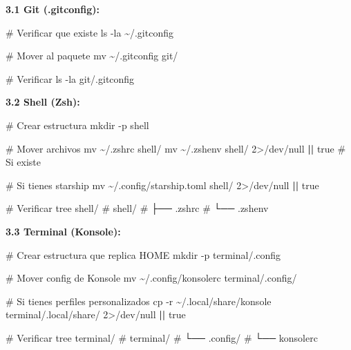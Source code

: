 \documentclass[
  doc,
  floatsintext,
  longtable,
  a4paper,
  nolmodern,
  notxfonts,
  notimes,
  12pt,
  colorlinks=true,linkcolor=blue,citecolor=blue,urlcolor=blue]{apa7}
\newenvironment{Shaded}{\begin{snugshade}}{\end{snugshade}}
\newcommand{\AttributeTok}[1]{\textcolor[rgb]{0.40,0.45,0.13}{#1}}
\newcommand{\CommentTok}[1]{\textcolor[rgb]{0.37,0.37,0.37}{#1}}
\newcommand{\DecValTok}[1]{\textcolor[rgb]{0.68,0.00,0.00}{#1}}
\newcommand{\ExtensionTok}[1]{\textcolor[rgb]{0.00,0.23,0.31}{#1}}
\newcommand{\FunctionTok}[1]{\textcolor[rgb]{0.28,0.35,0.67}{#1}}
\newcommand{\KeywordTok}[1]{\textcolor[rgb]{0.00,0.23,0.31}{\textbf{#1}}}
\newcommand{\NormalTok}[1]{\textcolor[rgb]{0.00,0.23,0.31}{#1}}
\newcommand{\OperatorTok}[1]{\textcolor[rgb]{0.37,0.37,0.37}{#1}}
\begin{document}
\textbf{3.1 Git (.gitconfig):}

\begin{Shaded}
\begin{Highlighting}[]
\CommentTok{\# Verificar que existe}
\FunctionTok{ls} \AttributeTok{{-}la}\NormalTok{ \textasciitilde{}/.gitconfig}

\CommentTok{\# Mover al paquete}
\FunctionTok{mv}\NormalTok{ \textasciitilde{}/.gitconfig git/}

\CommentTok{\# Verificar}
\FunctionTok{ls} \AttributeTok{{-}la}\NormalTok{ git/.gitconfig}
\end{Highlighting}
\end{Shaded}

\textbf{3.2 Shell (Zsh):}

\begin{Shaded}
\begin{Highlighting}[]
\CommentTok{\# Crear estructura}
\FunctionTok{mkdir} \AttributeTok{{-}p}\NormalTok{ shell}

\CommentTok{\# Mover archivos}
\FunctionTok{mv}\NormalTok{ \textasciitilde{}/.zshrc shell/}
\FunctionTok{mv}\NormalTok{ \textasciitilde{}/.zshenv shell/ }\DecValTok{2}\OperatorTok{\textgreater{}}\NormalTok{/dev/null }\KeywordTok{||} \FunctionTok{true}  \CommentTok{\# Si existe}

\CommentTok{\# Si tienes starship}
\FunctionTok{mv}\NormalTok{ \textasciitilde{}/.config/starship.toml shell/ }\DecValTok{2}\OperatorTok{\textgreater{}}\NormalTok{/dev/null }\KeywordTok{||} \FunctionTok{true}

\CommentTok{\# Verificar}
\ExtensionTok{tree}\NormalTok{ shell/}
\CommentTok{\# shell/}
\CommentTok{\# ├── .zshrc}
\CommentTok{\# └── .zshenv}
\end{Highlighting}
\end{Shaded}

\textbf{3.3 Terminal (Konsole):}

\begin{Shaded}
\begin{Highlighting}[]
\CommentTok{\# Crear estructura que replica HOME}
\FunctionTok{mkdir} \AttributeTok{{-}p}\NormalTok{ terminal/.config}

\CommentTok{\# Mover config de Konsole}
\FunctionTok{mv}\NormalTok{ \textasciitilde{}/.config/konsolerc terminal/.config/}

\CommentTok{\# Si tienes perfiles personalizados}
\FunctionTok{cp} \AttributeTok{{-}r}\NormalTok{ \textasciitilde{}/.local/share/konsole terminal/.local/share/ }\DecValTok{2}\OperatorTok{\textgreater{}}\NormalTok{/dev/null }\KeywordTok{||} \FunctionTok{true}

\CommentTok{\# Verificar}
\ExtensionTok{tree}\NormalTok{ terminal/}
\CommentTok{\# terminal/}
\CommentTok{\# └── .config/}
\CommentTok{\#     └── konsolerc}
\end{Highlighting}
\end{Shaded}
\end{document}
